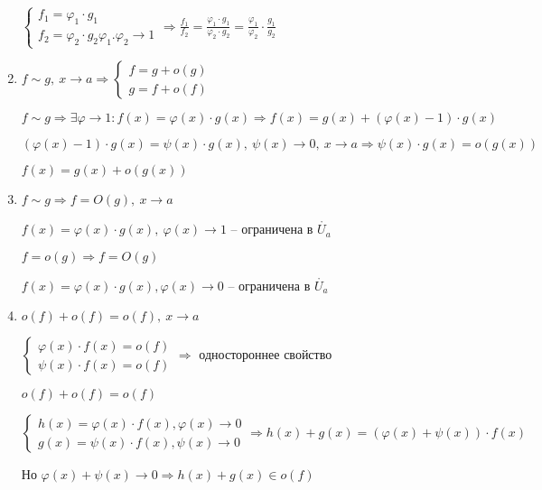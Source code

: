 \documentclass[14pt, letter paper]{article}
\begin{document}
\begin{enumerate}
    $\begin{cases}
        f_1 = \varphi_1 \cdot g_1 \\
        f_2 = \varphi_2 \cdot g_2
        \varphi_1. \varphi_2 \rightarrow 1
    \end{cases} \Rightarrow \frac{f_1}{f_2} = \frac{\varphi_1 \cdot g_1}{\varphi_2 \cdot g_2} = \frac{\varphi_1}{\varphi_2} \cdot \frac{g_1}{g_2}$

    \item $f \sim g,\ x \rightarrow a \Rightarrow \begin{cases}
        f = g + o(g) \\
        g = f + o(f)
    \end{cases}$

    $f \sim g \Rightarrow \exists \varphi \rightarrow 1 : f(x) = \varphi(x) \cdot g(x) \Rightarrow f(x) = g(x) + (\varphi(x) - 1) \cdot g(x)$

    $(\varphi(x) - 1) \cdot g(x) = \psi(x) \cdot g(x),\ \psi(x) \rightarrow 0,\ x \rightarrow a \Rightarrow \psi(x) \cdot g(x) = o(g(x))$

    $f(x) = g(x) + o(g(x))$

    \item $f \sim g \Rightarrow f = O(g),\ x \rightarrow a$

    $f(x) = \varphi(x) \cdot g(x),\ \varphi(x) \rightarrow 1$ -- ограничена в $\mathring{U_a}$

    $f = o(g) \Rightarrow f = O(g)$

    $f(x) = \varphi(x) \cdot g(x), \varphi(x) \rightarrow 0$ -- ограничена в $\mathring{U_a}$

    \item $o(f) + o(f) = o(f),\ x \rightarrow a$

    $\begin{cases}
        \varphi(x) \cdot f(x) = o(f) \\
        \psi(x) \cdot f(x) = o(f)
    \end{cases} \Rightarrow$ одностороннее свойство

    $o(f) + o(f) = o(f)$

    $\begin{cases}
        h(x) = \varphi(x) \cdot f(x), \varphi(x) \rightarrow 0 \\
        g(x) = \psi(x) \cdot f(x), \psi(x) \rightarrow 0
    \end{cases} \Rightarrow h(x) + g(x) = (\varphi(x) + \psi(x)) \cdot f(x)$

    Но $\varphi(x) + \psi(x) \rightarrow 0 \Rightarrow h(x) + g(x) \in o(f)$


\end{enumerate}
\end{document}
